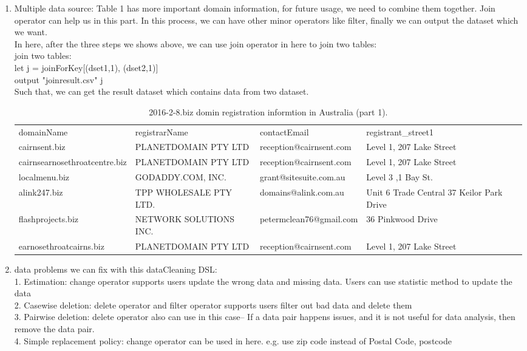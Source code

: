 \documentclass[11pt]{article}
\begin{document}
\begin{enumerate}[(1)]
 \item  Multiple data source:
Table 1 has more important domain information, for future usage, we need to combine them together. Join operator can help us in this part. In this process, we can have other minor operators like filter, finally we can output the dataset which we want.\\
In here, after the three steps we shows above, we can use join operator in here to join two tables:\\
 join two tables:\\
let j = joinForKey[(dset1,1), (dset2,1)]\\
output "joinresult.csv" j\\
Such that, we can get the result dataset which contains data from two dataset. \\
\begin{table}[h!]
  \centering
  \caption{2016-2-8.biz domin registration informtion in Australia (part 1).}
  \label{tab:table1}
       \begin{tabular}{llll}
domainName                    & registrarName          & contactEmail   &    registrant\_street1  \\
cairnsent.biz                 & PLANETDOMAIN PTY LTD   & reception@cairnsent.com  &Level 1, 207 Lake Street   \\
cairnsearnosethroatcentre.biz & PLANETDOMAIN PTY LTD   & reception@cairnsent.com & Level 1, 207 Lake Street  \\
localmenu.biz                 & GODADDY.COM, INC.      & grant@sitesuite.com.au &Level 3 ,1 Bay St.  \\
alink247.biz                  & TPP WHOLESALE PTY LTD. & domains@alink.com.au     & Unit 6 Trade Central 37 Keilor Park Drive  \\
flashprojects.biz             & NETWORK SOLUTIONS INC. & petermclean76@gmail.com   & 36 Pinkwood Drive    \\
earnosethroatcairns.biz       & PLANETDOMAIN PTY LTD   & reception@cairnsent.com     & Level 1, 207 Lake Street   


  \end{tabular}
\end{table}

\item data problems we can fix with this dataCleaning DSL:\\
 1. Estimation: change operator supports users update the wrong data and missing data. Users can use statistic method to update the data\\
2. Casewise deletion: delete operator and filter operator supports users filter out bad data and delete them \\
3. Pairwise deletion: delete operator also can use in this case-- If a data pair happens issues, and it is not useful for data analysis, then remove the data pair.\\
4. Simple replacement policy: change operator can be used in here.  e.g. use zip code instead of Postal Code, postcode\\

\end{enumerate}
\end{document}
